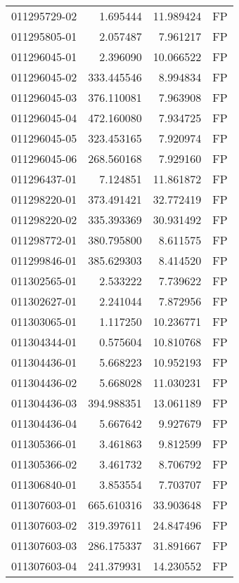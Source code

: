 \begin{tabular}{lrrl}
011295729-02 &    1.695444 &      11.989424 &   FP \\
011295805-01 &    2.057487 &       7.961217 &   FP \\
011296045-01 &    2.396090 &      10.066522 &   FP \\
011296045-02 &  333.445546 &       8.994834 &   FP \\
011296045-03 &  376.110081 &       7.963908 &   FP \\
011296045-04 &  472.160080 &       7.934725 &   FP \\
011296045-05 &  323.453165 &       7.920974 &   FP \\
011296045-06 &  268.560168 &       7.929160 &   FP \\
011296437-01 &    7.124851 &      11.861872 &   FP \\
011298220-01 &  373.491421 &      32.772419 &   FP \\
011298220-02 &  335.393369 &      30.931492 &   FP \\
011298772-01 &  380.795800 &       8.611575 &   FP \\
011299846-01 &  385.629303 &       8.414520 &   FP \\
011302565-01 &    2.533222 &       7.739622 &   FP \\
011302627-01 &    2.241044 &       7.872956 &   FP \\
011303065-01 &    1.117250 &      10.236771 &   FP \\
011304344-01 &    0.575604 &      10.810768 &   FP \\
011304436-01 &    5.668223 &      10.952193 &   FP \\
011304436-02 &    5.668028 &      11.030231 &   FP \\
011304436-03 &  394.988351 &      13.061189 &   FP \\
011304436-04 &    5.667642 &       9.927679 &   FP \\
011305366-01 &    3.461863 &       9.812599 &   FP \\
011305366-02 &    3.461732 &       8.706792 &   FP \\
011306840-01 &    3.853554 &       7.703707 &   FP \\
011307603-01 &  665.610316 &      33.903648 &   FP \\
011307603-02 &  319.397611 &      24.847496 &   FP \\
011307603-03 &  286.175337 &      31.891667 &   FP \\
011307603-04 &  241.379931 &      14.230552 &   FP \\

\end{tabular}

